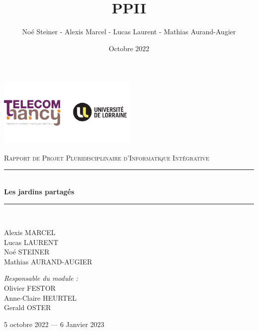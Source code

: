 \documentclass[french,a4paper]{article}
\title{PPII}
\author{Noé Steiner - Alexis Marcel - Lucas Laurent - Mathias Aurand-Augier}
\date{Octobre 2022}
\newcommand{\HRule}{\rule{\linewidth}{0.5mm}}
\begin{document}

\begin{titlepage}
    \begin{center}

    \includegraphics[width=0.5\textwidth]{tele_univ.png}

    \textsc{\Large Rapport de Projet Pluridisciplinaire d'Informatique Intégrative}\\[1.5cm]

    \HRule \\[0.4cm]
    { \huge \bfseries Les jardins partagés\\[0.4cm] }

    \HRule \\[2cm]

    \begin{minipage}{0.4\textwidth}
      \begin{flushleft} \large
        Alexis MARCEL\\
        Lucas LAURENT\\
        Noé STEINER\\
        Mathias AURAND-AUGIER\\
      \end{flushleft}
    \end{minipage}
    \begin{minipage}{0.4\textwidth}
      \begin{flushright} \large
        \emph{Responsable du module :}\\
        Olivier FESTOR\\
        Anne-Claire HEURTEL\\
        Gerald OSTER\\
      \end{flushright}
    \end{minipage}

    \vfill

    {\large 5 octobre 2022 — 6 Janvier 2023}

  \end{center}
\end{titlepage}
\newpage
\tableofcontents
\newpage
\end{document}
